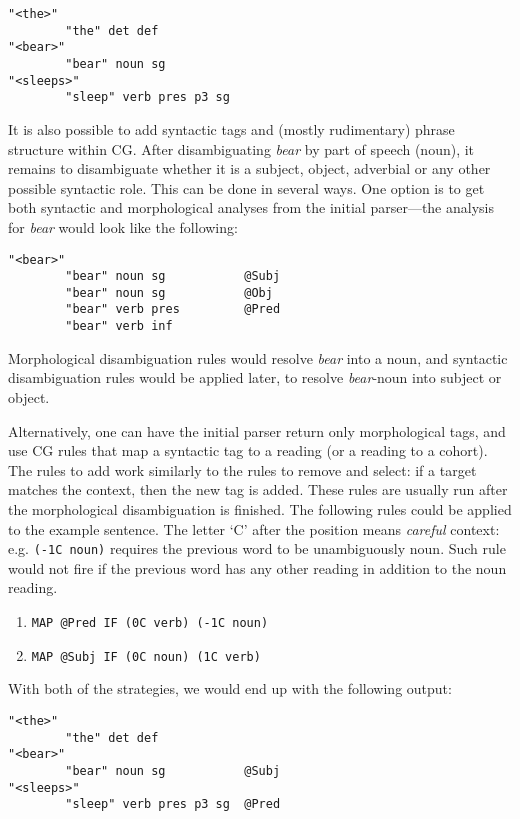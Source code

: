 \begin{verbatim}
"<the>"
        "the" det def
"<bear>"
        "bear" noun sg
"<sleeps>"
        "sleep" verb pres p3 sg
\end{verbatim}

It is also possible to add syntactic tags and (mostly rudimentary) phrase
structure within CG. 
After disambiguating \emph{bear} by part of speech (noun), it
remains to disambiguate whether it is a subject, object, adverbial or
any other possible syntactic role.
This can be done in several ways. One option is to get both
syntactic and morphological analyses from the initial parser---the analysis
for \emph{bear} would look like the following:

\begin{verbatim}
"<bear>"
        "bear" noun sg           @Subj
        "bear" noun sg           @Obj
        "bear" verb pres         @Pred
        "bear" verb inf 
\end{verbatim}

\noindent Morphological disambiguation rules would
resolve \emph{bear} into a noun, and syntactic disambiguation rules
would be applied later, to resolve \emph{bear}-noun into subject or object.

Alternatively, one can have the initial parser return only
morphological tags, and use CG rules that map a syntactic tag to a
reading (or a reading to a cohort).
The rules to add work similarly to the rules to remove and select:
if a target matches the context, then the new tag is added.
These rules are usually run after the morphological disambiguation is
finished.
The following rules could be applied to the example sentence. The
letter `C' after the position means \emph{careful} context: e.g. 
\texttt{(-1C noun)} requires the previous word to be unambiguously
noun. Such rule would not fire if the previous word has any other
reading in addition to the noun reading.

\begin{enumerate}
\itemsep1pt\parskip0pt
\item[] \texttt{MAP @Pred IF (0C verb) (-1C noun)}
\item[] \texttt{MAP @Subj IF (0C noun) (1C verb)}
\end{enumerate}

\noindent With both of the strategies, we would end up with the
following output:

\begin{verbatim}
"<the>"
        "the" det def            
"<bear>"
        "bear" noun sg           @Subj 
"<sleeps>"
        "sleep" verb pres p3 sg  @Pred

\end{verbatim}

